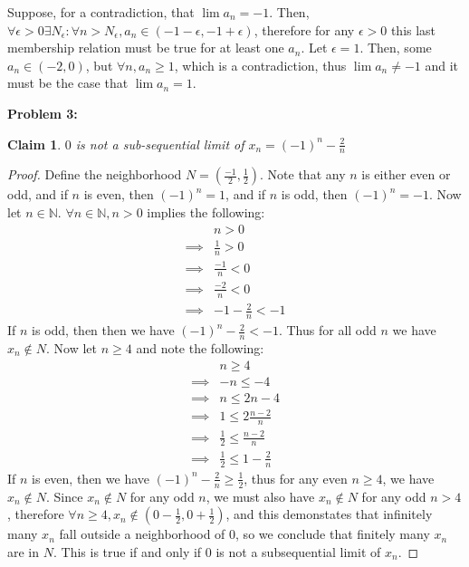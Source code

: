 \documentclass{article}
\newcommand{\nats}{\ensuremath{\mathbb{N}}}
\newcommand{\eps}{\ensuremath{\epsilon}}
\newtheorem{clm}{Claim}
\begin{document}
Suppose, for a contradiction, that $\lim a_n = -1$.
Then, $\forall \eps > 0 \exists N_\eps: \forall n > N_\eps, a_n \in (-1 - \eps, -1 + \eps)$,
therefore for any $\eps > 0$ this last membership relation must be true for at least one $a_n$.
Let $\eps = 1$. Then, some $a_n \in (-2, 0)$, but $\forall n, a_n \geq 1$,
which is a contradiction, thus $\lim a_n \neq -1$
and it must be the case that $\lim a_n = 1$.

\medskip
\textbf{Problem 3:}

\begin{clm}
	$0$ is not a sub-sequential limit of $x_n = (-1)^n - \frac{2}{n}$
\end{clm}

\begin{proof}
	Define the neighborhood $N = (\frac{-1}{2}, \frac{1}{2})$.
	Note that any $n$ is either even or odd,
	and if $n$ is even, then $(-1)^n = 1$,
	and if $n$ is odd, then $(-1)^n = -1$.
	Now let $n \in \nats$.
	$\forall n \in \nats, n > 0$ implies the following:
	\begin{align}
		& n > 0 \\
		\implies & \frac{1}{n} > 0 \\
		\implies & \frac{-1}{n} < 0 \\
		\implies & \frac{-2}{n} < 0 \\
		\implies & -1 - \frac{2}{n} < -1
	\end{align}
	If $n$ is odd, then then we have
	$(-1)^n - \frac{2}{n} < -1$.
	Thus for all odd $n$ we have  $x_n \not\in N$.
	Now let $n \geq 4$ and note the following:
	\begin{align}
		& n \geq 4 \\
		\implies & -n \le -4 \\
		\implies & n \le 2n-4 \\
		\implies & 1 \le 2\frac{n-2}{n} \\
		\implies & \frac{1}{2} \le \frac{n-2}{n} \\
		\implies & \frac{1}{2} \le 1 - \frac{2}{n}
	\end{align}
	If $n$ is even, then we have 
	$(-1)^n - \frac{2}{n} \geq \frac{1}{2}$,
	thus for any even $n \geq 4$, we have $x_n \not\in N$.
	Since $x_n \not\in N$ for any odd $n$,
	we must also have $x_n \not\in N$ for any odd $n > 4$,
	therefore $\forall n \geq 4, x_n \not\in (0- \frac{1}{2}, 0 + \frac{1}{2})$,
	and this demonstates that infinitely many $x_n$ fall outside a neighborhood of $0$,
	so we conclude that finitely many $x_n$ are in $N$.
	This is true if and only if $0$
	is not a subsequential limit of $x_n$.
\end{proof}
\end{document}
